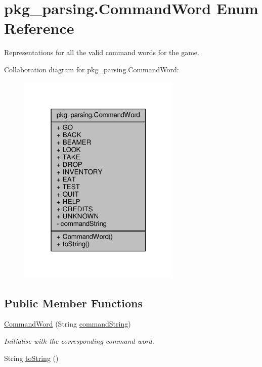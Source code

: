\hypertarget{enumpkg__parsing_1_1CommandWord}{\section{pkg\-\_\-parsing.\-Command\-Word Enum Reference}
\label{enumpkg__parsing_1_1CommandWord}
}


Representations for all the valid command words for the game.  




Collaboration diagram for pkg\-\_\-parsing.\-Command\-Word\-:
\nopagebreak
\begin{figure}[H]
\begin{center}
\leavevmode
\includegraphics[width=220pt]{enumpkg__parsing_1_1CommandWord__coll__graph}
\end{center}
\end{figure}
\subsection*{Public Member Functions}
\begin{DoxyCompactItemize}
\item 
\hyperlink{enumpkg__parsing_1_1CommandWord_a7ff71159ae2c26835f5336580152d088}{Command\-Word} (String \hyperlink{enumpkg__parsing_1_1CommandWord_a2def2bcb3d7c2e973ad357341f4bd5b3}{command\-String})
\begin{DoxyCompactList}\small\item\em Initialise with the corresponding command word. \end{DoxyCompactList}\item 
String \hyperlink{enumpkg__parsing_1_1CommandWord_ab6d70b61b7418ce7dfa930bda64132c5}{to\-String} ()
\end{DoxyCompactItemize}
